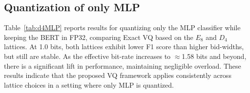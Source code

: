 \documentclass{article}
\theoremstyle{definition}
\theoremstyle{remark}
\begin{document}
\subsection{Quantization of only MLP}
Table~\ref{tab:d4MLP} reports results for quantizing only the MLP classifier while keeping the BERT in FP32, comparing Exact VQ based on the $E_8$ and $D_4$ lattices. At 1.0 bits, both lattices exhibit lower F1 score than higher bid-widths, but still are stable. As the effective bit-rate increases to $\approx$1.58 bits and beyond, there is a significant lift in performance, maintaining negligible overload. These results indicate that the proposed VQ framework applies consistently across lattice choices in a setting where only MLP is quantized.
    
         
\end{document}
